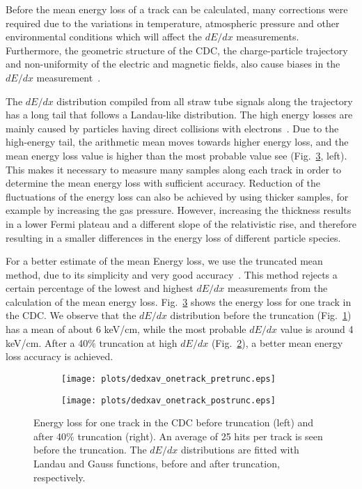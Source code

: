 Before the mean energy loss of a track can be calculated, many corrections were required due to the variations in temperature, atmospheric pressure and other environmental conditions which will affect the $dE/dx$ measurements. Furthermore, the geometric structure of the CDC, the charge-particle trajectory and non-uniformity of the electric and magnetic fields, also cause biases in the $dE/dx$ measurement~\cite{Blum08,Cao10,Hauschild96}.
~\par The $dE/dx$ distribution compiled from all straw tube signals along the trajectory has a long tail that follows a Landau-like distribution. The high energy losses are mainly caused by particles having direct collisions with electrons~\cite{Leo94}. Due to the high-energy tail, the arithmetic mean moves towards higher energy loss, and the mean energy loss value is higher than the most probable value see (Fig.~\ref{fig.3.3}, left). This makes it necessary to measure many samples along each track in order to determine the mean energy loss with sufficient accuracy. Reduction of the fluctuations of the energy loss can also be achieved by using thicker samples, for example by increasing the gas pressure. However, increasing the thickness results in a lower Fermi plateau and a different slope of the relativistic rise, and therefore resulting in a smaller differences in the energy loss of different particle species.
~\par For a better estimate of the mean Energy loss, we use the truncated mean method, due to its simplicity and very good accuracy~\cite{Blum08,Cao10,Hauschild96}. This method rejects a certain percentage of the lowest and highest $dE/dx$ measurements from the calculation of the mean energy loss. Fig.~\ref{fig.3.3} shows the energy loss for one track in the CDC. We observe that the $dE/dx$ distribution before the truncation (Fig.~\ref{fig.3.3.a}) has a mean of about 6 keV/cm, while the most probable $dE/dx$ value is around 4 keV/cm. After a 40$\%$ truncation at high $dE/dx$ (Fig.~\ref{fig.3.3.b}), a better mean energy loss accuracy is achieved.

\begin{figure}[htbp]
    \centering
    \begin{subfigure}[b]{0.5\textwidth}
        \texttt{[image: plots/dedxav\_onetrack\_pretrunc.eps]}
        \caption{}
        \label{fig.3.3.a}        
    \end{subfigure}\hfill
    \begin{subfigure}[b]{0.5\textwidth}
        \texttt{[image: plots/dedxav\_onetrack\_postrunc.eps]}
        \caption{}
        \label{fig.3.3.b}        
    \end{subfigure}
    \caption{Energy loss for one track in the CDC before truncation (left) and after 40$\%$ truncation (right). An average of 25 hits per track is seen before the truncation. The $dE/dx$ distributions are fitted with Landau and Gauss functions, before and after truncation, respectively.}
    \label{fig.3.3}
\end{figure}
\vfill

